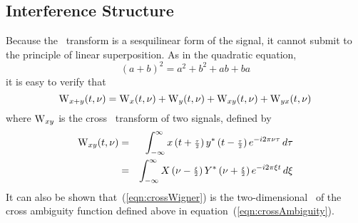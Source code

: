 \subsection{Interference Structure}%
Because the \WV\ transform is a sesquilinear form of the signal, it
cannot submit to the principle of linear superposition.  As in
the quadratic equation,
\[
(a+b)^2 = a^2 + b^2 + ab + ba
\]
it is easy to verify that
\begin{equation}
\label{eqn:Wignersum} 
  \operatorname{W}_{x+y}(t,\nu) = \operatorname{W}_x(t,\nu) + \operatorname{W}_y(t,\nu) +
                    \operatorname{W}_{xy}(t,\nu) +\operatorname{W}_{yx}(t,\nu) 
\end{equation}
where $\operatorname{W}_{xy}$ is the cross \WV\ transform of two signals, defined by
\begin{eqnarray}
\label{eqn:crossWigner}
  \operatorname{W}_{xy}(t,\nu) 
  &=& \int_{-\infty}^{\infty} x\left(t+{\scriptstyle \frac{\tau}{2}}\right) y^*\left(t-{\scriptstyle \frac{\tau}{2}}\right) e^{-i2\pi\nu\tau}\,d\tau\\
  &=& \int_{-\infty}^{\infty} X\left(\nu-{\scriptstyle \frac{\xi}{2}}\right) Y^*\left(\nu+{\scriptstyle \frac{\xi}{2}}\right) e^{-i2\pi\xi t}\,d\xi\nonumber
\end{eqnarray}
It can also be shown that~(\ref{eqn:crossWigner}) is the
two-dimensional \FT\ of the cross ambiguity function defined above in
equation~(\ref{eqn:crossAmbiguity}).


